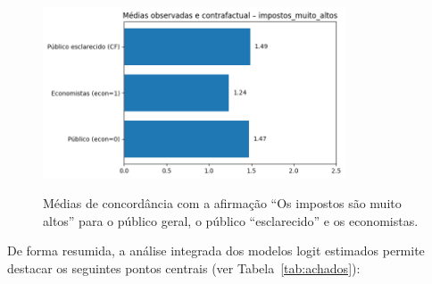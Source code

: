 \begin{figure}[htbp]
\centering
\caption{Médias de concordância com a afirmação ``Os impostos são muito altos'' para o público geral, o público ``esclarecido'' e os economistas.}
\includegraphics[width=0.8\textwidth]{Textuais/analise/imagens/impostos_muito_altos.png}
\notafig
\label{fig:impostos}
\end{figure}

De forma resumida, a análise integrada dos modelos logit estimados permite destacar os seguintes pontos centrais (ver Tabela~\ref{tab:achados}): 

